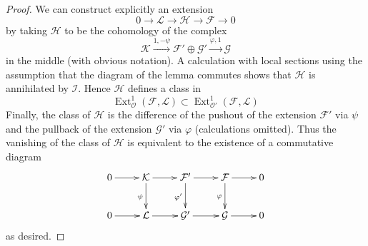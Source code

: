 \documentclass[10pt,a4paper]{amsart}
\theoremstyle{plain}
\theoremstyle{definition}
\theoremstyle{remark}
\numberwithin{equation}{subsection}
\def\Ext{\mathop{\mathrm{Ext}}\nolimits}
\begin{document}
\begin{proof}
We can construct explicitly an extension
$$
0 \to \mathcal{L} \to \mathcal{H} \to \mathcal{F} \to 0
$$
by taking $\mathcal{H}$ to be the cohomology of the complex
$$
\mathcal{K}
\xrightarrow{1, - \psi}
\mathcal{F}' \oplus \mathcal{G}' \xrightarrow{\varphi, 1}
\mathcal{G}
$$
in the middle (with obvious notation). A calculation with local sections
using the assumption that the diagram of the lemma commutes
shows that $\mathcal{H}$ is annihilated by $\mathcal{I}$. Hence
$\mathcal{H}$ defines a class in
$$
\Ext^1_\mathcal{O}(\mathcal{F}, \mathcal{L})
\subset
\Ext^1_{\mathcal{O}'}(\mathcal{F}, \mathcal{L})
$$
Finally, the class of $\mathcal{H}$ is the difference of the pushout
of the extension $\mathcal{F}'$ via $\psi$ and the pullback
of the extension $\mathcal{G}'$ via $\varphi$ (calculations omitted).
Thus the vanishing of the class of $\mathcal{H}$ is equivalent to the
existence of a commutative diagram
$$
\xymatrix{
0 \ar[r] &
\mathcal{K} \ar[r] \ar[d]_{\psi} &
\mathcal{F}' \ar[r] \ar[d]_{\varphi'} &
\mathcal{F} \ar[r] \ar[d]_\varphi & 0\\
0 \ar[r] &
\mathcal{L} \ar[r] &
\mathcal{G}' \ar[r] &
\mathcal{G} \ar[r] & 0
}
$$
as desired.
\end{proof}
\end{document}
